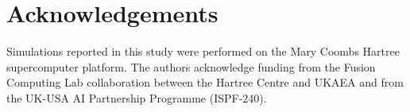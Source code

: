 \documentclass[authoryear,preprint,review,12pt]{elsarticle}
\begin{document}
\section*{Acknowledgements}

Simulations reported in this study were performed on the Mary Coombs Hartree supercomputer platform. The authors acknowledge funding from the Fusion Computing Lab collaboration between the Hartree Centre and UKAEA and from the UK-USA AI Partnership Programme (ISPF-240).



\end{document}
